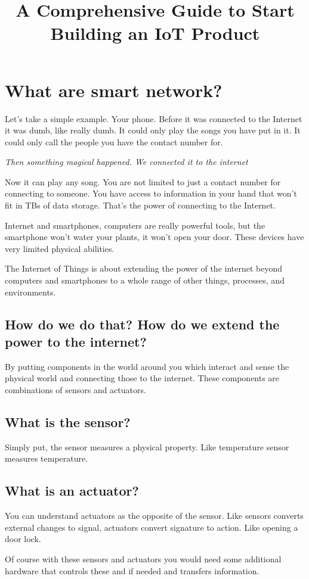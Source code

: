 \documentclass[12pt]{report}
\title{A Comprehensive Guide to Start Building an IoT Product}
\begin{document}
\chapter{What are smart network?}

Let’s take a simple example. Your phone. Before it was connected to the Internet it was dumb, like really dumb. It could only play the songs you have put in it. It could only call the people you have the contact number for.

\textit{Then something magical happened. We connected it to the internet}

Now it can play any song. You are not limited to just a contact number for connecting to someone. You have access to information in your hand that won’t fit in TBs of data storage. That’s the power of connecting to the Internet.

Internet and smartphones, computers are really powerful tools, but the smartphone won’t water your plants, it won’t open your door. These devices have very limited physical abilities.

The Internet of Things is about extending the power of the internet beyond computers and smartphones to a whole range of other things, processes, and environments.

\section{How do we do that? How do we extend the power to the internet?}
By putting components in the world around you which interact and sense the physical world and connecting those to the internet. These components are combinations of sensors and actuators.

\section{What is the sensor?}
Simply put, the sensor measures a physical property. Like temperature sensor measures temperature.

\section{What is an actuator?}
You can understand actuators as the opposite of the sensor. Like sensors converts external changes to signal, actuators convert signature to action. Like opening a door lock.

Of course with these sensors and actuators you would need some additional hardware that controls these and if needed and transfers information.
\end{document}
